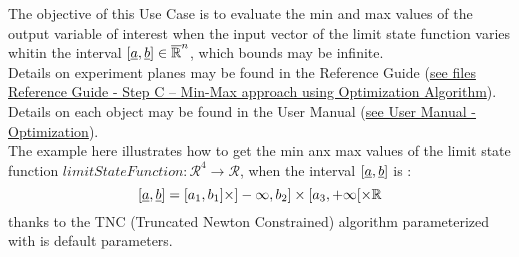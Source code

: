 \renewcommand{\filename}{docUC_MinMax_Evaluation2.tex}
\renewcommand{\filetitle}{UC : Min/Max research  with an optimization algorithm}

\HeaderIIILevel




The objective of this Use Case is to evaluate the min and max values of the output variable of interest when the input vector of the limit state function varies whitin the interval  $[{\underline{a}}, {\underline{b}}] \in \overline{\mathbb{R}}^n$, which bounds may be infinite. \\


Details on experiment planes  may be found in the Reference Guide (\href{OpenTURNS_ReferenceGuide.pdf}{see files Reference Guide - Step C -- Min-Max approach using Optimization Algorithm}).\\

Details on each object may be found in the User Manual  (\href{OpenTURNS_UserManual_TUI.pdf}{see User Manual - Optimization}).\\




The example here illustrates how to get the min anx max values of the limit state function $limitStateFunction : \mathcal{R}^4 \longrightarrow \mathcal{R}$, when the interval  $[{\underline{a}}, {\underline{b}}] $ is :
$$
[{\underline{a}}, {\underline{b}}] = [a_1, b_1] \times ]-\infty, b_2] \times [a_3, +\infty[ \times \mathbb{R}
$$
thanks to the TNC (Truncated Newton Constrained) algorithm parameterized with is default parameters.\\




